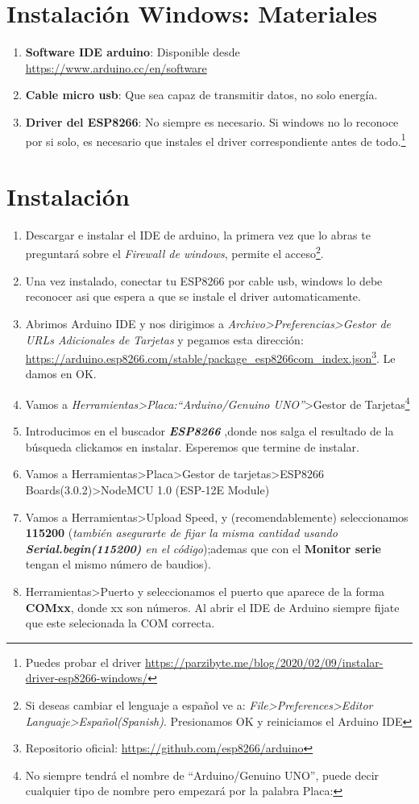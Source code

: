 \documentclass[
	12pt, %
	fleqn, %
	a4paper, %
	oneside, %
]{LegrandOrangeBook}
\begin{document}
\section{Instalación Windows: Materiales}
\begin{enumerate}
\item \textbf{Software IDE arduino}: Disponible desde \url{https://www.arduino.cc/en/software}
\item \textbf{Cable micro usb}: Que sea capaz de transmitir datos, no solo energía.
\item \textbf{Driver del ESP8266}: No siempre es necesario. Si windows no lo reconoce por si solo, es necesario que instales el driver correspondiente antes de todo.\footnote{Puedes probar el driver \url{https://parzibyte.me/blog/2020/02/09/instalar-driver-esp8266-windows/} }
\end{enumerate}
\section{Instalación}
\begin{enumerate}
\item Descargar e instalar el IDE de arduino, la primera vez que lo abras te preguntará sobre el \textit{Firewall de windows}, permite el acceso\footnote{Si deseas cambiar el lenguaje a español ve a: \textit{File>Preferences>Editor Languaje>Español(Spanish)}. Presionamos OK y reiniciamos el Arduino IDE}.
\item Una vez instalado, conectar tu ESP8266 por cable usb, windows lo debe reconocer asi que espera a que se instale el driver automaticamente.
\item Abrimos Arduino IDE y nos dirigimos a \textit{Archivo>Preferencias>Gestor de URLs Adicionales de Tarjetas} y pegamos esta dirección: \url{https://arduino.esp8266.com/stable/package_esp8266com_index.json}\footnote{Repositorio oficial: \url{https://github.com/esp8266/arduino}}. Le damos en OK.
\item Vamos a \textit{Herramientas>Placa:``Arduino/Genuino UNO''}>Gestor de Tarjetas\footnote{No siempre tendrá el nombre de ``Arduino/Genuino UNO'', puede decir cualquier tipo de nombre pero empezará por la palabra Placa:}
\item Introducimos en el buscador \textbf{\textit{ESP8266}} ,donde nos salga el resultado de la búsqueda clickamos en instalar. Esperemos que termine de instalar.
\item Vamos a Herramientas>Placa>Gestor de tarjetas>ESP8266 Boards(3.0.2)>NodeMCU 1.0 (ESP-12E Module)
\item Vamos a Herramientas>Upload Speed, y (recomendablemente) seleccionamos \textbf{115200} (\textit{también asegurarte de fijar la misma cantidad usando \textbf{Serial.begin(115200)}  en el código});ademas que con el \textbf{Monitor serie} tengan el mismo número de baudios).
\item Herramientas>Puerto y seleccionamos el puerto que aparece de la forma \textbf{COMxx}, donde xx son números. Al abrir el IDE de Arduino siempre fijate que este selecionada la COM correcta.
\end{enumerate}
\end{document}

